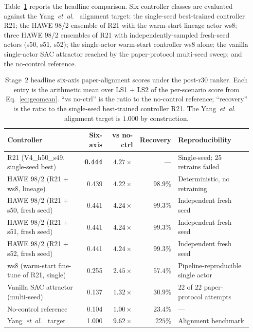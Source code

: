 \documentclass{unnc-fyp}
\begin{document}
Table~\ref{tab:s2-headline} reports the headline comparison.
Six controller classes are evaluated against the
Yang~\emph{et~al.}~\cite{yang2023ddic} alignment target: the
single-seed best-trained controller R21; the HAWE 98/2 ensemble
of R21 with the warm-start lineage actor ws8; three HAWE 98/2
ensembles of R21 with independently-sampled fresh-seed actors
(s50, s51, s52); the single-actor warm-start controller ws8
alone; the vanilla single-actor SAC attractor reached by the
paper-protocol multi-seed sweep; and the no-control reference.
\begin{table}[tb]
  \centering
  \small
  \caption{Stage~2 headline six-axis paper-alignment scores under
           the post-r30 ranker. Each entry is the arithmetic mean
           over LS1 + LS2 of the per-scenario score from
           Eq.~\eqref{eq:geomean}. ``vs no-ctrl'' is the ratio to
           the no-control reference; ``recovery'' is the ratio to
           the single-seed best-trained controller R21. The
           Yang~\emph{et~al.}~\cite{yang2023ddic} alignment target
           is $1.000$ by construction.}
  \label{tab:s2-headline}
  \begin{tabular}{@{}lr@{\hskip 1.0em}r@{\hskip 1.0em}r@{\hskip 1.0em}p{4.4cm}@{}}
    \toprule
    Controller
      & Six-axis
      & vs no-ctrl
      & Recovery
      & Reproducibility \\
    \midrule
    R21 (V4\_h50\_s49, single-seed best)
      & \textbf{0.444} & $4.27\times$ & ---       & Single-seed; 25 retrains failed \\
    HAWE 98/2 (R21 + ws8, lineage)
      & 0.439          & $4.22\times$ & $98.9\%$  & Deterministic, no retraining \\
    HAWE 98/2 (R21 + s50, fresh seed)
      & 0.441          & $4.24\times$ & $99.3\%$  & Independent fresh seed \\
    HAWE 98/2 (R21 + s51, fresh seed)
      & 0.441          & $4.24\times$ & $99.3\%$  & Independent fresh seed \\
    HAWE 98/2 (R21 + s52, fresh seed)
      & 0.441          & $4.24\times$ & $99.3\%$  & Independent fresh seed \\
    ws8 (warm-start fine-tune of R21, single)
      & 0.255          & $2.45\times$ & $57.4\%$  & Pipeline-reproducible single actor \\
    Vanilla SAC attractor (multi-seed)
      & 0.137          & $1.32\times$ & $30.9\%$  & 22 of 22 paper-protocol attempts \\
    No-control reference
      & 0.104          & $1.00\times$ & $23.4\%$  & --- \\
    Yang~\emph{et~al.}~\cite{yang2023ddic} target
      & 1.000          & $9.62\times$ & $225\%$   & Alignment benchmark \\
    \bottomrule
  \end{tabular}
\end{table}
\end{document}
